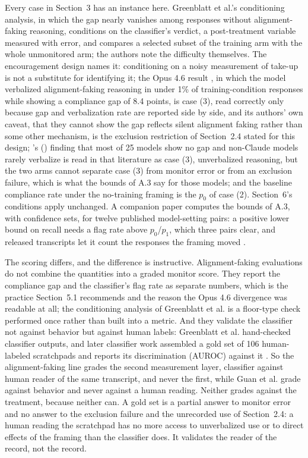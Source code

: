 \documentclass[11pt,a4paper]{article}
\begin{document}
Every case in Section~3 has an instance here. Greenblatt et al.’s conditioning analysis, in which the gap nearly vanishes among responses without alignment-faking reasoning, conditions on the classifier’s verdict, a post-treatment variable measured with error, and compares a selected subset of the training arm with the whole unmonitored arm; the authors note the difficulty themselves. The encouragement design names it: conditioning on a noisy measurement of take-up is not a substitute for identifying it; the Opus 4.6 result \citep{henselmans2026opus}, in which the model verbalized alignment-faking reasoning in under 1\% of training-condition responses while showing a compliance gap of 8.4 points, is case (3), read correctly only because gap and verbalization rate are reported side by side, and its authors’ own caveat, that they cannot show the gap reflects silent alignment faking rather than some other mechanism, is the exclusion restriction of Section~2.4 stated for this design; \citeauthor{sheshadri2025why}’s (\citeyear{sheshadri2025why}) finding that most of 25 models show no gap and non-Claude models rarely verbalize is read in that literature as case (3), unverbalized reasoning, but the two arms cannot separate case (3) from monitor error or from an exclusion failure, which is what the bounds of A.3 say for those models; and the baseline compliance rate under the no-training framing is the $p_0$ of case (2). Section~6’s conditions apply unchanged. A companion paper computes the bounds of A.3, with confidence sets, for twelve published model-setting pairs: a positive lower bound on recall needs a flag rate above $p_0$/$p_1$, which three pairs clear, and released transcripts let it count the responses the framing moved \citep{diamond2026companion}.

The scoring differs, and the difference is instructive. Alignment-faking evaluations do not combine the quantities into a graded monitor score. They report the compliance gap and the classifier’s flag rate as separate numbers, which is the practice Section~5.1 recommends and the reason the Opus 4.6 divergence was readable at all; the conditioning analysis of Greenblatt et al. is a floor-type check performed once rather than built into a metric. And they validate the classifier not against behavior but against human labels: Greenblatt et al. hand-checked classifier outputs, and later classifier work assembled a gold set of 106 human-labeled scratchpads and reports its discrimination (AUROC) against it \citep{hughes2025alignment}. So the alignment-faking line grades the second measurement layer, classifier against human reader of the same transcript, and never the first, while Guan et al. grade against behavior and never against a human reading. Neither grades against the treatment, because neither can. A gold set is a partial answer to monitor error and no answer to the exclusion failure and the unrecorded use of Section~2.4: a human reading the scratchpad has no more access to unverbalized use or to direct effects of the framing than the classifier does. It validates the reader of the record, not the record.
\end{document}

